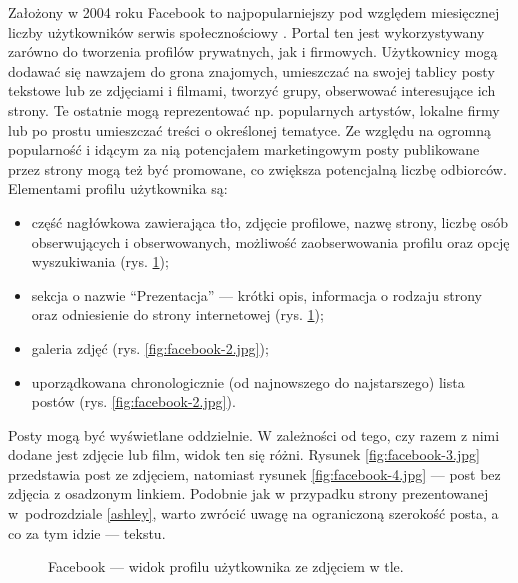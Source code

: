 \documentclass[a4paper, 12pt]{article}
\numberwithin{figure}{section}
\begin{document}
\begin{sloppypar}
Założony w 2004 roku \cite{historiafacebooka} Facebook to najpopularniejszy pod względem miesięcznej liczby użytkowników serwis społecznościowy \cite{socialmediastats}. Portal ten jest wykorzystywany zarówno do tworzenia profilów prywatnych, jak i firmowych. Użytkownicy mogą dodawać się nawzajem do grona znajomych, umieszczać na swojej tablicy posty tekstowe lub ze zdjęciami i filmami, tworzyć grupy, obserwować interesujące ich strony. Te ostatnie mogą reprezentować np. popularnych artystów, lokalne firmy lub po prostu umieszczać treści o określonej tematyce. Ze względu na ogromną popularność i idącym za nią potencjałem marketingowym posty publikowane przez strony mogą też być promowane, co zwiększa potencjalną liczbę odbiorców. Elementami profilu użytkownika są: 
\begin{itemize}
    \item część nagłówkowa zawierająca tło, zdjęcie profilowe, nazwę strony, liczbę osób obserwujących i obserwowanych, możliwość zaobserwowania profilu oraz opcję wyszukiwania (rys. \ref{fig:facebook-1.jpg});
    \item sekcja o nazwie ``Prezentacja'' --- krótki opis, informacja o rodzaju strony oraz odniesienie do strony internetowej (rys. \ref{fig:facebook-1.jpg});
    \item galeria zdjęć (rys. \ref{fig:facebook-2.jpg});
    \item uporządkowana chronologicznie (od najnowszego do najstarszego) lista postów (rys. \ref{fig:facebook-2.jpg}).
\end{itemize}
Posty mogą być wyświetlane oddzielnie. W zależności od tego, czy razem z nimi dodane jest zdjęcie lub film, widok ten się różni. Rysunek \ref{fig:facebook-3.jpg} przedstawia post ze zdjęciem, natomiast rysunek \ref{fig:facebook-4.jpg} --- post bez zdjęcia z osadzonym linkiem. Podobnie jak w przypadku strony prezentowanej w~podrozdziale \ref{ashley}, warto zwrócić uwagę na ograniczoną szerokość posta, a co za tym idzie --- tekstu.

\begin{figure}[H] 
    \centering
   \caption{Facebook --- widok profilu użytkownika ze zdjęciem w tle.}
   \label{fig:facebook-1.jpg}
\end{figure}


\end{sloppypar}
\end{document}
